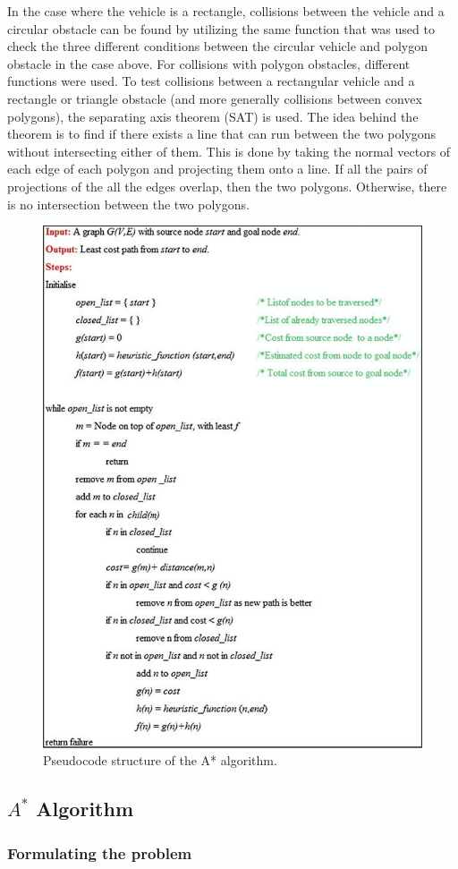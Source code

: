\documentclass[10pt,letterpaper]{article}
\begin{document}
\noindent In the case where the vehicle is a rectangle, collisions between the vehicle and a circular obstacle can be found by utilizing the same function that was used to check the three different conditions between the circular vehicle and polygon obstacle in the case above. For collisions with polygon obstacles, different functions were used. To test collisions between a rectangular vehicle and a rectangle or triangle obstacle (and more generally collisions between convex polygons), the separating axis theorem (SAT) is used. The idea behind the theorem is to find if there exists a line that can run between the two polygons without intersecting either of them. This is done by taking the normal vectors of each edge of each polygon and projecting them onto a line. If all the pairs of projections of the all the edges overlap, then the two polygons. Otherwise, there is no intersection between the two polygons.

\begin{figure}[!h]
    \centering
    \includegraphics[width= 7.5 cm]{figures/astar.png}
    \caption{Pseudocode structure of the A* algorithm.}
    \label{fig: a_star}
\end{figure}


\subsection{$A^*$ Algorithm}

    \subsubsection*{Formulating the problem}
    
\end{document}
